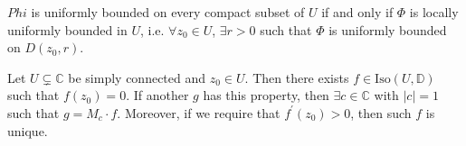 \begin{remark}
$Phi$ is uniformly bounded on every compact subset of $U$ if and only
if $\Phi$ is locally uniformly bounded in $U$, i.e.
$\forall z_0 \in U$, $\exists r > 0$ such that $\Phi$ is uniformly
bounded on $D(z_0, r)$.
\end{remark}

\begin{theorem}
Let $U \subsetneq \mathbb{C}$ be simply connected and $z_0 \in U$.
Then there exists $f \in \mathrm{Iso}(U, \mathbb{D})$ such that
$f(z_0) = 0$. If another $g$ has this property, then
$\exists c \in \mathbb{C}$ with $|c| = 1$ such that $g = M_c \cdot f$.
Moreover, if we require that $f^\prime(z_0) > 0$, then such $f$ is unique.
\end{theorem}

